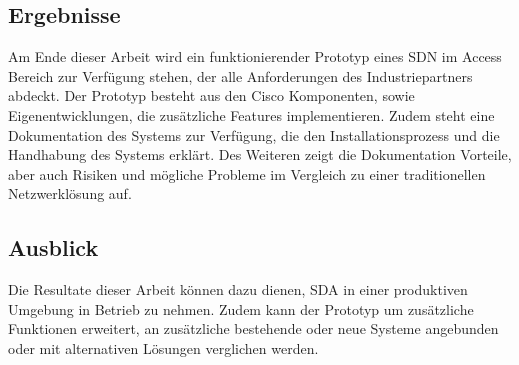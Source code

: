 \subsection{Ergebnisse}
Am Ende dieser Arbeit wird ein funktionierender Prototyp eines SDN im Access Bereich zur Verfügung stehen, der alle Anforderungen des Industriepartners abdeckt. Der Prototyp besteht aus den Cisco Komponenten, sowie Eigenentwicklungen, die zusätzliche Features implementieren. 
Zudem steht eine Dokumentation des Systems zur Verfügung, die den Installationsprozess und die Handhabung des Systems erklärt. Des Weiteren zeigt die Dokumentation Vorteile, aber auch Risiken und mögliche Probleme im Vergleich zu einer traditionellen Netzwerklösung auf.
\subsection{Ausblick}
Die Resultate dieser Arbeit können dazu dienen, SDA in einer produktiven Umgebung in Betrieb zu nehmen. Zudem kann der Prototyp um zusätzliche Funktionen erweitert, an zusätzliche bestehende oder neue Systeme angebunden oder mit alternativen Lösungen verglichen werden.
